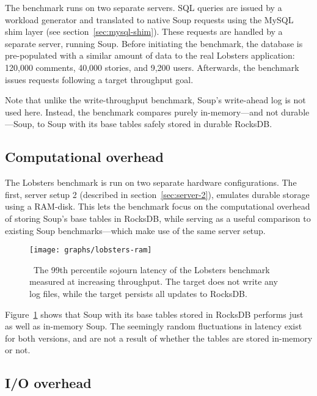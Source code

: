 
The benchmark runs on two separate servers. SQL queries are issued by a workload
generator and translated to native Soup requests using the MySQL shim layer (see
section~\ref{sec:mysql-shim}). These requests are handled by a separate server,
running Soup. Before initiating the benchmark, the database is pre-populated
with a similar amount of data to the real Lobsters application: 120,000
comments, 40,000 stories, and 9,200 users. Afterwards, the benchmark issues
requests following a target throughput goal.

Note that unlike the write-throughput benchmark, Soup's write-ahead log is not
used here. Instead, the benchmark compares purely in-memory---and not
durable---Soup, to Soup with its base tables safely stored in durable RocksDB.\@

\subsection{Computational overhead}

The Lobsters benchmark is run on two separate hardware configurations. The
first, server setup 2 (described in section~\ref{sec:server-2}), emulates
durable storage using a
RAM-disk.
This lets the benchmark focus on the computational overhead of storing Soup's
base tables in RocksDB, while serving as a useful comparison to existing Soup
benchmarks---which make use of the same server setup.

\begin{figure}[H]
  \texttt{[image: graphs/lobsters-ram]}
  \caption{\
    The 99th percentile sojourn latency of the Lobsters benchmark measured at
    increasing throughput. The \code{soup} target does not write any log files,
    while the \code{rocksdb\_soup} target persists all updates to RocksDB.
  }\label{fig:lobsters-ram}
\end{figure}

Figure~\ref{fig:lobsters-ram} shows that Soup with its base tables stored in
RocksDB performs just as well as in-memory Soup. The seemingly random
fluctuations in latency exist for both versions, and are not a result of whether
the tables are stored in-memory or not.

\subsection{I/O overhead}

